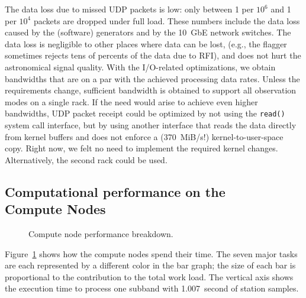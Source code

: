 \documentclass{sig-alternate}
\begin{document}
The data loss due to missed UDP packets is low: only between 1 per $10^6$ and
1 per $10^4$ packets are dropped under full load.
These numbers include the data loss caused by the (software) generators and by
the 10~GbE network switches.
The data loss is negligible to other places where data can be lost,
(e.g., the flagger sometimes rejects tens of percents of the data due to RFI),
and does not hurt the astronomical signal quality.
With the I/O-related optimizations, we obtain bandwidths that are on a par
with the achieved processing data rates.
Unless the requirements change, sufficient bandwidth is obtained to support
all observation modes on a single rack.
If the need would arise to achieve even higher bandwidths, UDP packet receipt
could be optimized by not using the \texttt{read()} system call interface,
but by using another interface that reads the data directly from kernel buffers
and does not enforce a (370~MiB/s!) kernel-to-user-space copy.
Right now, we felt no need to implement the required kernel changes.
Alternatively, the second rack could be used.


\subsection{Computational performance on the \\ Compute Nodes}

\begin{figure}[ht]
\hfill
\caption{Compute node performance breakdown.}
\label{fig:cn-performance}
\end{figure}

Figure~\ref{fig:cn-performance} shows how the compute nodes spend their time.
The seven major tasks are each represented by a different color in the bar
graph; the size of each bar is proportional to the contribution to the total
work load.
The vertical axis shows the execution time to process one subband with
1.007~second of station samples.
\end{document}
